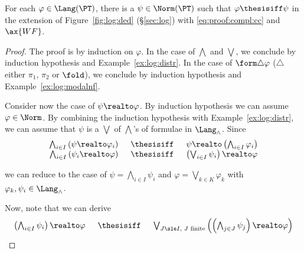 \begin{lemma}
\label{lem:proof:compl:nf:wf}
For each $\varphi \in \Lang(\PT)$, there is a $\psi \in \Norm(\PT)$
such that $\varphi \thesisiff \psi$
in the extension of Figure~\ref{fig:log:ded} (\S\ref{sec:log})
with \eqref{eq:proof:compl:cc} and $\ax{WF}$.
\end{lemma}


\begin{proof}
The proof is by induction on $\varphi$.
In the case of $\bigwedge$ and $\bigvee$,
we conclude by induction hypothesis and Example~\ref{ex:log:distr}.
In the case of $\form\triangle\varphi$ ($\triangle$ either $\pi_1$, $\pi_2$ or $\fold$),
we conclude by induction hypothesis and Example~\ref{ex:log:modalnf}.

Consider now the case of $\psi \realto \varphi$.
By induction hypothesis we can assume $\varphi \in \Norm$.
By combining the induction hypothesis with 
Example~\ref{ex:log:distr},
we can assume that $\psi$
is a $\bigvee$ of $\bigwedge$'s of formulae in $\Lang_\land$.
Since
\[
\begin{array}{r !{\quad\thesisiff\quad} l}
  \bigwedge_{i \in I}\left(\psi \realto \varphi_i \right)
& \psi \realto \left(\bigwedge_{i \in I} \varphi_i\right)
\\

  \bigwedge_{i \in I}\left( \psi_i \realto \varphi \right)
& \left(\bigvee_{i \in I} \psi_i \right) \realto \varphi
\end{array}
\]

\noindent
we can reduce to the case of
$\psi = \bigwedge_{i \in I}\psi_i$
and
$\varphi = \bigvee_{k \in K}\varphi_k$
with $\varphi_k,\psi_i \in \Lang_\land$.

Now, note that we can derive
\[
\begin{array}{r !{\quad\thesisiff\quad} l}
  \left( \bigwedge_{i \in I} \psi_i \right)
  \realto
  \varphi
& \bigvee_{\text{$J \sle I$, $J$ finite}}
  \left(
  \left( \bigwedge_{j \in J} \psi_j \right)
  \realto
  \varphi
  \right)
\end{array}
\]


\end{proof}
